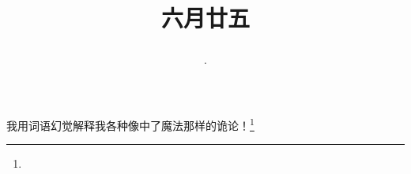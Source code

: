 \title{\date[d=30,m=7,y=2024][year:cn-y,年,month:cn,day:cn,日,·,weekday]·六月廿五 }
我用词语幻觉解释我各种像中了魔法那样的诡论！\footnote{ }

